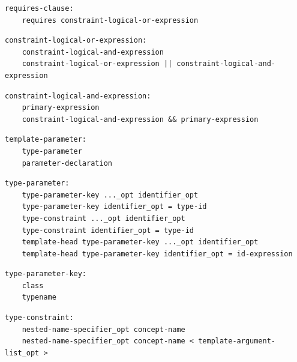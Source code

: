 \noindent\textbf{\texttt{}}\par
\begin{lstlisting}
requires-clause:
    requires constraint-logical-or-expression
\end{lstlisting}

\noindent\textbf{\texttt{}}\par
\begin{lstlisting}
constraint-logical-or-expression:
    constraint-logical-and-expression
    constraint-logical-or-expression || constraint-logical-and-expression
\end{lstlisting}

\noindent\textbf{\texttt{}}\par
\begin{lstlisting}
constraint-logical-and-expression:
    primary-expression
    constraint-logical-and-expression && primary-expression
\end{lstlisting}

\noindent\textbf{\texttt{}}\par
\begin{lstlisting}
template-parameter:
    type-parameter
    parameter-declaration
\end{lstlisting}

\noindent\textbf{\texttt{}}\par
\begin{lstlisting}
type-parameter:
    type-parameter-key ..._opt identifier_opt
    type-parameter-key identifier_opt = type-id
    type-constraint ..._opt identifier_opt
    type-constraint identifier_opt = type-id
    template-head type-parameter-key ..._opt identifier_opt
    template-head type-parameter-key identifier_opt = id-expression
\end{lstlisting}

\noindent\textbf{\texttt{}}\par
\begin{lstlisting}
type-parameter-key:
    class
    typename
\end{lstlisting}

\noindent\textbf{\texttt{}}\par
\begin{lstlisting}
type-constraint:
    nested-name-specifier_opt concept-name
    nested-name-specifier_opt concept-name < template-argument-list_opt >
\end{lstlisting}

